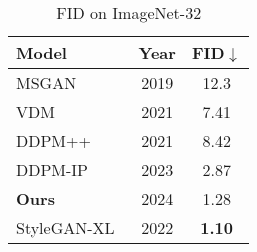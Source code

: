 \begin{table}[h]
\centering
\caption{FID on ImageNet-32}
\begin{tabular}{ l c c }
\toprule
Model & \textbf{Year} & FID$\downarrow$ \\
\midrule
MSGAN~\cite{karnewar2020msg} & 2019 & 12.3 \\
VDM~\cite{kingma2021variational} & 2021 & 7.41 \\
DDPM++~\cite{kim2021soft} & 2021 & 8.42 \\
DDPM-IP~\cite{ning2023input} & 2023 & 2.87 \\
\textbf{Ours} & 2024 & 1.28 \\
StyleGAN-XL~\cite{sauer2022stylegan} & 2022 & \textbf{1.10} \\
\bottomrule
\end{tabular}
\end{table}